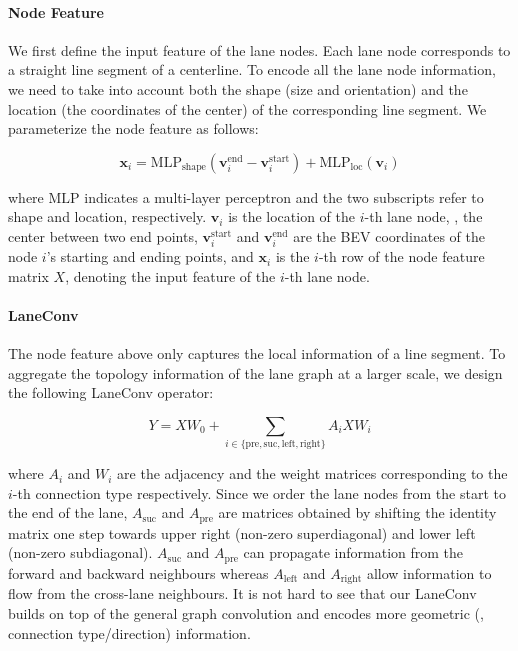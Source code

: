 \paragraph{Node Feature}

We first define the input feature of the lane nodes. Each lane node corresponds to a straight line segment of a centerline. To encode  all the lane node information, we need to take into account both the shape (size and orientation) and the location (the coordinates of the center) of the corresponding line segment. We parameterize the node feature as follows:

\begin{equation}
	\mathbf{x}_i = \text{MLP}_\text{shape} \left( \mathbf{v}_i^{\text{end}} - \mathbf{v}_i^{\text{start}} \right)
	+ \text{MLP}_{\text{loc}}\left(\textbf{v}_i\right)
	\label{eqn:node_feat}
\end{equation}

where $\text{MLP}$ indicates a multi-layer perceptron and the two subscripts refer to shape and location, respectively.  $\textbf{v}_i$ is the location of the $i$-th lane node, \ie, the center between two end points, $\mathbf{v}_i^{\text{start}}$ and $\mathbf{v}_i^{\text{end}}$ are the BEV coordinates of the node $i$'s starting and ending points, and $\mathbf{x}_i$ is the $i$-th row of the node feature matrix $X$, denoting the input feature of the $i$-th lane node.

\paragraph{LaneConv}

The node feature above only captures the local information of a line segment.
To aggregate the topology information of the lane graph at a larger scale,
we design the following LaneConv operator:

\begin{equation}
	Y = X W_0 + \sum_{i \in \{ \text{pre}, \text{suc}, \text{left}, \text{right} \}} {A_{i} X W_{i}}
	\label{eqn:laneconv}
\end{equation}

where $A_{i}$ and $W_i$ are the adjacency  and the weight matrices corresponding to the $i$-th connection type respectively. Since we order the lane nodes from the start to the end of the lane, $A_{\text{suc}}$ and $A_{\text{pre}}$ are matrices obtained by shifting the identity matrix one step towards upper right (non-zero superdiagonal) and lower left (non-zero subdiagonal). $A_{\text{suc}}$ and $A_{\text{pre}}$ can propagate information from the forward and backward neighbours whereas $A_{\text{left}}$ and $A_{\text{right}}$ allow information to flow from the cross-lane neighbours. It is not hard to see that our LaneConv builds on top of the general graph convolution and encodes more geometric (\eg, connection type/direction) information.

